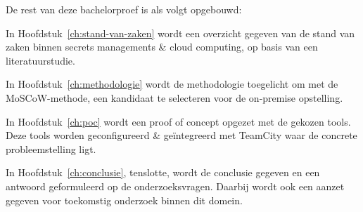 
De rest van deze bachelorproef is als volgt opgebouwd:

In Hoofdstuk~\ref{ch:stand-van-zaken} wordt een overzicht gegeven van de stand van zaken binnen secrets managements \& cloud computing, op basis van een literatuurstudie.

In Hoofdstuk~\ref{ch:methodologie} wordt de methodologie toegelicht om met de MoSCoW-methode, een kandidaat te selecteren voor de on-premise opstelling.

In Hoofdstuk~\ref{ch:poc} wordt een proof of concept opgezet met de gekozen tools. Deze tools worden geconfigureerd \& geïntegreerd met TeamCity waar de concrete probleemstelling ligt.


In Hoofdstuk~\ref{ch:conclusie}, tenslotte, wordt de conclusie gegeven en een antwoord geformuleerd op de onderzoeksvragen. Daarbij wordt ook een aanzet gegeven voor toekomstig onderzoek binnen dit domein.